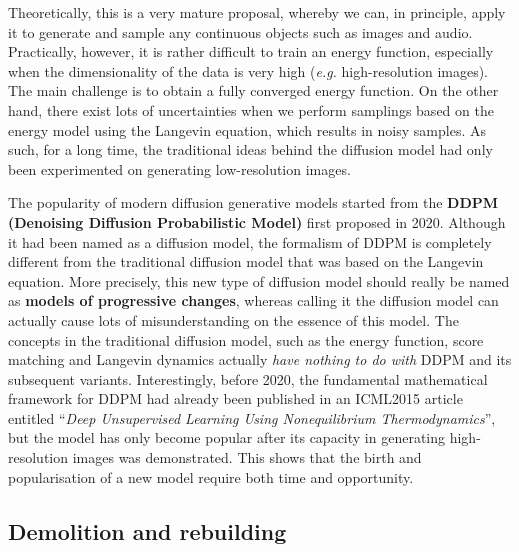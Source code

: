 Theoretically, this is a very mature proposal, whereby we can, in principle, apply it to generate and sample any continuous objects such as images and audio. Practically, however, it is rather difficult to train an energy function, especially when the dimensionality of the data is very high (\emph{e.g.} high-resolution images). The main challenge is to obtain a fully converged energy function. On the other hand, there exist lots of uncertainties when we perform samplings based on the energy model using the Langevin equation, which results in noisy samples. As such, for a long time, the traditional ideas behind the diffusion model had only been experimented on generating low-resolution images. 

The popularity of modern diffusion generative models started from the \textbf{DDPM (Denoising Diffusion Probabilistic Model)}\cite{ho2020denoising} first proposed in 2020. Although it had been named as a diffusion model, the formalism of DDPM is completely different from the traditional diffusion model that was based on the Langevin equation. More precisely, this new type of diffusion model should really be named as \textbf{models of progressive changes}, whereas calling it the diffusion model can actually cause lots of misunderstanding on the essence of this model. The concepts in the traditional diffusion model, such as the energy function, score matching and Langevin dynamics actually \emph{have nothing to do with} DDPM and its subsequent variants. Interestingly, before 2020, the fundamental mathematical framework for DDPM had already been published in an ICML2015 article\cite{sohl2015deep} entitled ``\emph{Deep Unsupervised Learning Using Nonequilibrium Thermodynamics}'', but the model has only become popular after its capacity in generating high-resolution images was demonstrated. This shows that the birth and popularisation of a new model require both time and opportunity.

\subsection{Demolition and rebuilding}

